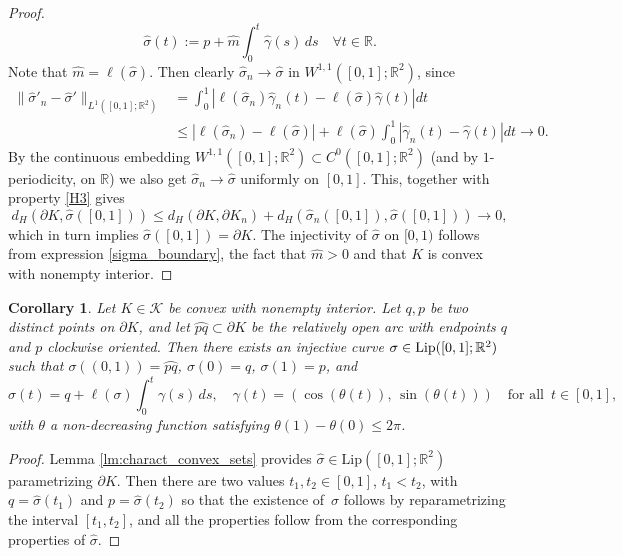 \documentclass[JEP,XML,SOM,Unicode, NoFloatCountersInSection,published]{cedram}
\newcommand{\R}{\mathbb{R}}
\let\arc\wideparen
\let\len\ell
\newcommand{\Lip}{\mathrm{Lip}}
\newtheorem{cor}[theorem]{Corollary}
\theoremstyle{definition}
\begin{document}
\begin{proof}
\begin{equation}
\widehat \sigma(t):=p+\widehat m\int_0^t\widehat \gamma(s)\,ds\quad \forall t\in\mathbb R.
\end{equation}
Note that $\widehat m=\len(\widehat\sigma)$.
Then clearly $\widehat \sigma_n\to \widehat \sigma$ in $W^{1,1}([0,1];\R^2)$, since
\begin{equation}
\begin{split}
\|\widehat \sigma'_n-\widehat \sigma'\|_{L^1([0,1];\R^2)}&= \int_0^1|\len(\widehat\sigma_n) \widehat \gamma_n(t)-\len(\widehat\sigma)\widehat \gamma(t)|dt\\
&\le |\len(\widehat\sigma_n)-\len(\widehat\sigma)|+\len
(\widehat\sigma)\int_0^1|\widehat \gamma_n(t)-\widehat \gamma(t)|dt\to0.
\end{split}
\label{ti-chiamo-per-nome}
\end{equation}
By the continuous embedding $W^{1,1}([0,1];\R^2)\subset C^0([0,1];\R^2)$ (and by $1$-periodicity, on $\R$) we also get $\widehat \sigma_n\to\widehat \sigma$ uniformly on $[0,1]$.
This, together with property \ref{H3} gives
\begin{equation*}
d_H(\partial K,\widehat \sigma([0,1]))\le d_H(\partial K,\partial K_n)+d_H(\widehat \sigma_n([0,1]),\widehat \sigma([0,1]))\to0,
\end{equation*}
which in turn implies $\widehat\sigma([0,1])=\partial K$. The injectivity of $\widehat \sigma$ on $[0,1)$ follows from expression \eqref{sigma_boundary}, the fact that $\widehat m>0$ and that $K$ is convex with nonempty interior.
\end{proof}

\begin{cor}\label{lm:charact_convex_sets2}
Let $K\in\mathcal K$ be convex with nonempty interior. Let $q,p$ be two distinct points on $\partial K$, and let $\arc{pq}\subset\partial K$ be the relatively open arc with endpoints $q$ and $p$ clockwise oriented.
Then there exists an injective curve $\sigma\in {\rm{Lip}}([0,1];\R^2)$ such that $\sigma((0,1))=\arc{pq}$, $\sigma(0)=q$, $\sigma(1)=p$, and
\begin{equation*}
\sigma(t)=q+\len(\sigma)\int_0^t\gamma(s)\,ds,\quad \gamma(t)=(\cos(\theta(t)),\,\sin(\theta(t)))\quad \text{for all }\, t\in[0,1],
\end{equation*}
with $\theta$ a non-decreasing function satisfying $\theta(1)-\theta(0)\le2\pi$.
\end{cor}

\begin{proof}
Lemma \ref{lm:charact_convex_sets} provides $\widehat \sigma\in \Lip ([0,1];\R^2)$ parametrizing $\partial K$. Then there are two values $t_1,t_2\in [0,1]$, $t_1<t_2$, with $q=\widehat\sigma(t_1)$ and $p=\widehat\sigma(t_2)$ so that the existence of~$\sigma$ follows by reparametrizing the interval $[t_1,t_2]$, and all the properties follow from the corresponding properties of $\widehat \sigma$.
\end{proof}

\backmatter


\end{document}
